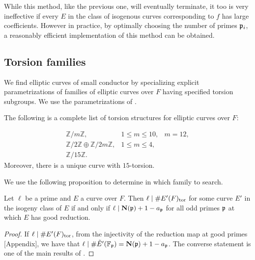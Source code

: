\documentclass{amsart}
\begin{document}
While this method, like the previous one, will eventually terminate, it too is very
ineffective if every $E$ in the class of isogenous curves corresponding to $f$ has
large coefficients. However in practice, by optimally choosing the number of primes $\mathfrak{p}_i$, 
a reasonably efficient implementation of this method can be obtained.

\subsection{Torsion families}\label{sec:torsion}

We find elliptic curves of small conductor by specializing explicit parametrizations
of families of elliptic curves over $F$ having specified torsion subgroups.
We use the parametrizations of \cite{kubert:torfam}.

\begin{theorem} The following is
a complete list of torsion structures for elliptic curves over $F$:

$$\begin{array}{lll}
\mathbb{Z}/m\mathbb{Z},   &1 \leq m \leq 10,& m = 12,\\
\mathbb{Z}/2\mathbb{Z} \oplus \mathbb{Z}/2m\mathbb{Z}, &  1 \leq m \leq 4,&\\
\mathbb{Z}/15\mathbb{Z}.&&
\end{array}$$ 
Moreover, there is a unique curve with $15$-torsion.
\end{theorem}

We use the following proposition to determine in which family to
search.
\begin{proposition}\label{prop:ptor}
Let $\ell$ be a prime and $E$ a curve over $F$.
Then $\ell \mid \# E'(F)_{\operatorname{tor}}$ for some curve $E'$ in the isogeny class
of $E$ if and only if $\ell \mid \mathbf{N}(\mathfrak{p})+1 - a_{\mathfrak{p}}$ for all
odd primes $\mathfrak{p}$ at which $E$ has good reduction.
\end{proposition}
\begin{proof}
If $\ell  \mid \# E'(F)_{\operatorname{tor}}$, from the injectivity of the
reduction map at good primes \cite{katz:torsion}[Appendix], we have that
$\ell \mid \#\tilde E'(\mathbb{F}_{\mathfrak{p}}) = \mathbf{N}(\mathfrak{p})+1 - a_{\mathfrak{p}}$. The converse statement
is one of the main results of \cite{katz:torsion}.
\end{proof}
\end{document}
